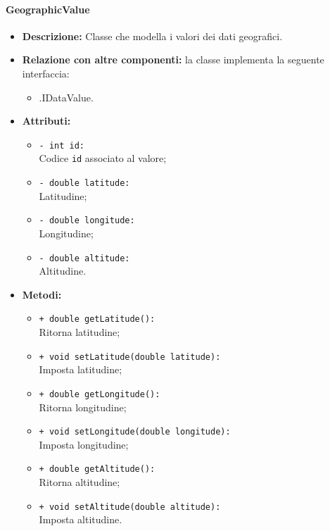 \paragraph{GeographicValue}
\label{botgeographicvalue}
\begin{flushleft}
\begin{itemize}
\item \textbf{Descrizione:} Classe che modella i valori dei dati geografici.
\item \textbf{Relazione con altre componenti:} la classe implementa la seguente interfaccia:
		\begin{itemize}
			\item \smodel{}.IDataValue.
		\end{itemize}
\item \textbf{Attributi:}
\begin{sloppypar}
\begin{itemize}
\item \texttt{- int id:}\\ Codice \texttt{id} associato al valore;
\item \texttt{- double latitude:}\\ Latitudine;
\item \texttt{- double longitude:}\\ Longitudine;
\item \texttt{- double altitude:}\\ Altitudine.
\end{itemize}
\end{sloppypar}
\item \textbf{Metodi:}
\begin{sloppypar}
\begin{itemize}
\item \texttt{+ double getLatitude():}\\ Ritorna latitudine;
\item \texttt{+ void setLatitude(double latitude):}\\ Imposta latitudine;
\item \texttt{+ double getLongitude():}\\ Ritorna longitudine;
\item \texttt{+ void setLongitude(double longitude):}\\ Imposta longitudine;
\item \texttt{+ double getAltitude():}\\ Ritorna altitudine;
\item \texttt{+ void setAltitude(double altitude):}\\ Imposta altitudine.
\end{itemize}
\end{sloppypar}
\end{itemize}
\end{flushleft}

